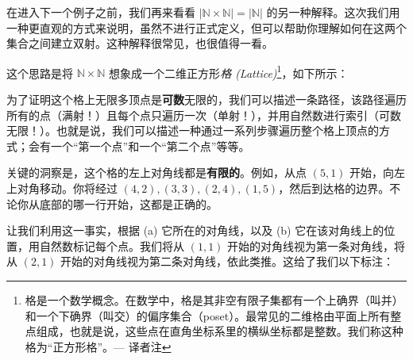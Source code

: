 \begin{example}\label{ex:example7.6.14}

    在进入下一个例子之前，我们再来看看 $|\mathbb{N} \times \mathbb{N}| = |\mathbb{N}|$ 的另一种解释。这次我们用一种更直观的方式来说明，虽然不进行正式定义，但可以帮助你理解如何在这两个集合之间建立双射。这种解释很常见，也很值得一看。

    这个思路是将 $\mathbb{N} \times \mathbb{N}$ 想象成一个二维正方形\emph{格 (Lattice)}\footnote{格是一个数学概念。在数学中，格是其非空有限子集都有一个上确界（叫并）和一个下确界（叫交）的偏序集合（poset）。最常见的二维格由平面上所有整点组成，也就是说，这些点在直角坐标系里的横纵坐标都是整数。我们称这种格为``正方形格''。--- 译者注}，如下所示：

    \begin{center}
    \end{center}

    为了证明这个格上无限多顶点是\textbf{可数}无限的，我们可以描述一条路径，该路径遍历所有的点（满射！）且每个点只遍历一次（单射！），并用自然数进行索引（可数无限！）。也就是说，我们可以描述一种通过一系列步骤遍历整个格上顶点的方式；会有一个``第一个点''和一个``第二个点''等等。

    关键的洞察是，这个格的左上对角线都是\textbf{有限的}。例如，从点 $(5, 1)$ 开始，向左上对角移动。你将经过 $(4, 2), (3, 3), (2, 4), (1, 5)$，然后到达格的边界。不论你从底部的哪一行开始，这都是正确的。

    让我们利用这一事实，根据 (a) 它所在的对角线，以及 (b) 它在该对角线上的位置，用自然数标记每个点。我们将从 $(1, 1)$ 开始的对角线视为第一条对角线，将从 $(2, 1)$ 开始的对角线视为第二条对角线，依此类推。这给了我们以下标注：

    \begin{center}
\end{center}
\end{example}
